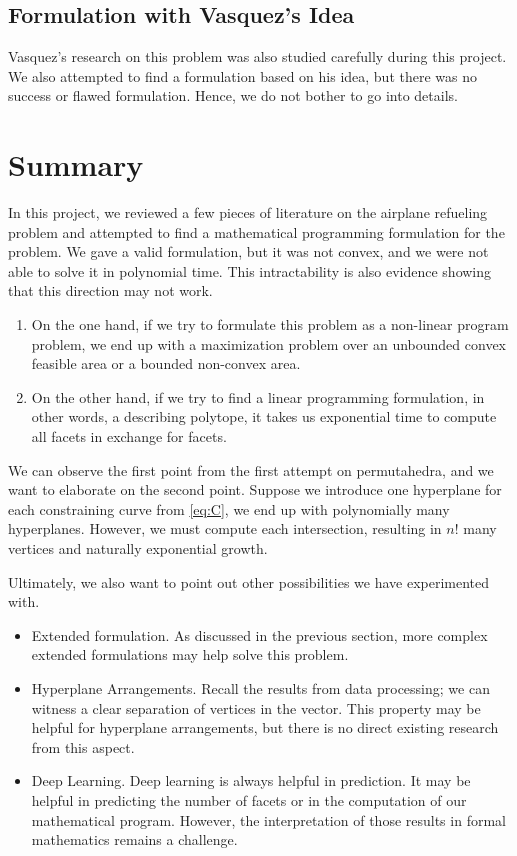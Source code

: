 \documentclass[12pt,letterpaper]{article}
\begin{document}
\subsection{Formulation with Vasquez's Idea}
Vasquez's research \cite{vasquez2015airplane} on this problem was also studied carefully during this project. 
We also attempted to find a formulation based on his idea, but there was no success or flawed formulation. 
Hence, we do not bother to go into details. 

\section{Summary}
In this project, we reviewed a few pieces of literature on the airplane refueling problem and 
attempted to find a mathematical programming formulation for the problem. 
We gave a valid formulation, but it was not convex, and we were not able to solve it in polynomial time. 
This intractability is also evidence showing that this direction may not work.
\begin{enumerate}
    \item On the one hand, if we try to formulate this problem as a non-linear program problem, we end up 
 with a maximization problem over an unbounded convex feasible area or a bounded non-convex area. 
    \item On the other hand, if we try to find a linear programming formulation, in other words, a describing polytope, 
 it takes us exponential time to compute all facets in exchange for facets. 
\end{enumerate}
We can observe the first point from the first attempt on permutahedra, and we want to elaborate on the second point. 
Suppose we introduce one hyperplane for each constraining curve from \ref{eq:C}, we end up with polynomially many hyperplanes. 
However, we must compute each intersection, resulting in $n!$ many vertices and naturally exponential growth. 

Ultimately, we also want to point out other possibilities we have experimented with.
\begin{itemize}
    \item Extended formulation. As discussed in the previous section, more complex extended formulations may help solve this 
 problem. 
    \item Hyperplane Arrangements. Recall the results from data processing; we can witness a clear separation of vertices in the vector. 
 This property may be helpful for hyperplane arrangements, but there is no direct existing research from this aspect. 
    \item Deep Learning. Deep learning is always helpful in prediction. It may be helpful in predicting the number of facets or in the
 computation of our mathematical program. However, the interpretation of those results in formal mathematics remains a challenge. 
\end{itemize}



\end{document}
